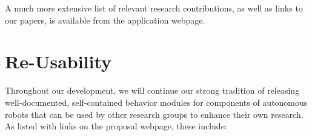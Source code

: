 %





A much more extensive list of relevant research contributions, as well
as links to our papers, is available from the application webpage.

\section{Re-Usability}
\label{sec:reuse}

Throughout our development, we will continue our strong tradition of releasing well-documented, self-contained behavior modules for components of autonomous robots that can be used by other research groups to enhance their own research.  As listed with links on the proposal webpage, these include:

